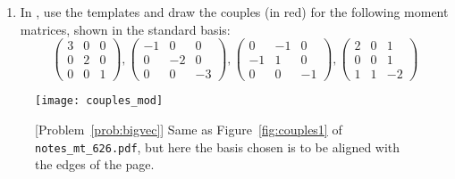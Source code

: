 \documentclass[11pt,titlepage,fleqn]{article}
\newcommand{\mtfile}{\texttt{notes\_mt\_626.pdf}}
\begin{document}
\begin{enumerate}

\item 
\label{prob:arrows}
In , use the templates and draw the couples (in red) for the following moment matrices, shown in the standard basis:
%
\begin{equation*}
\begin{pmatrix} 3 &  0 & 0 \\  0 & 2 & 0 \\ 0 & 0 &  1 \end{pmatrix},
\begin{pmatrix} -1 &  0 & 0 \\  0 & -2 & 0 \\ 0 & 0 & -3 \end{pmatrix},
\begin{pmatrix} 0 & -1 & 0 \\ -1 & 1 & 0 \\ 0 & 0 & -1 \end{pmatrix},
\begin{pmatrix} 2 &  0 & 1 \\  0 & 0 & 1 \\ 1 & 1 & -2 \end{pmatrix}
\end{equation*}


\end{enumerate}






\begin{figure}
\centering
\texttt{[image: couples\_mod]}
\caption{
[Problem~\ref{prob:bigvec}] Same as Figure~\ref{fig:couples1} of \mtfile, but here the basis chosen is to be aligned with the edges of the page.
\label{fig:template}
}
\end{figure}
\end{document}
